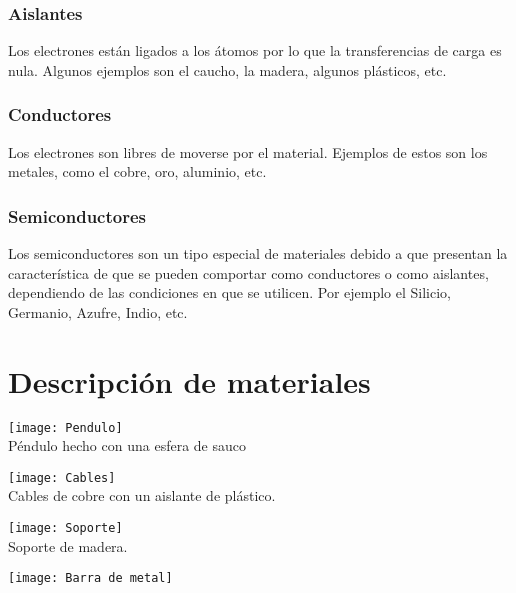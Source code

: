 \documentclass[10pt]{article}
\begin{document}
\begin{multicols}{2}
	\subsubsection{Aislantes}
	Los electrones están ligados a los átomos por lo que la transferencias de carga es nula. Algunos ejemplos son el caucho, la madera, algunos plásticos, etc.
	\subsubsection{Conductores}
	Los electrones son libres de moverse por el material. Ejemplos de estos son los metales, como el cobre, oro, aluminio, etc.
	\subsubsection{Semiconductores}
	Los semiconductores son un tipo especial de materiales debido a que
	presentan la característica de que se pueden comportar como conductores
	o como aislantes, dependiendo de las condiciones en que se utilicen. Por ejemplo el Silicio, Germanio, Azufre, Indio, etc.

	\section{Descripción de materiales}

	\begin{center}
		\texttt{[image: Pendulo]}\\

		Péndulo hecho con una esfera de sauco
	\end{center}

	\begin{center}
		\texttt{[image: Cables]}\\

		Cables de cobre con un aislante de plástico.

	\end{center}

	\begin{center}

		\texttt{[image: Soporte]}\\

		Soporte de madera.

	\end{center}

	\begin{center}


		\texttt{[image: Barra de metal]}\\


\end{center}
\end{multicols}
\end{document}
